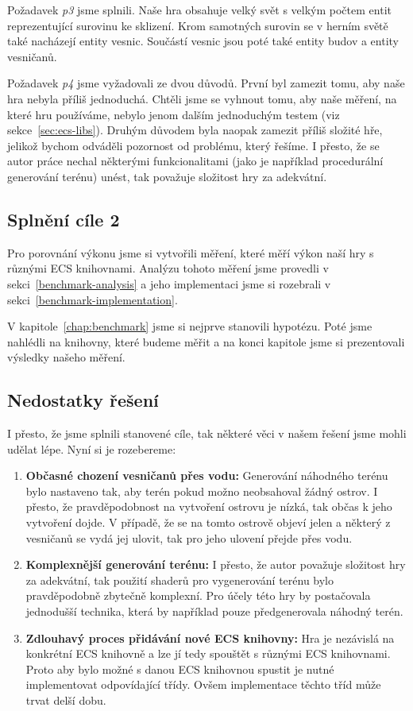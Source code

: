 Požadavek \textit{p3} jsme splnili. Naše hra obsahuje velký svět s velkým počtem entit reprezentující surovinu ke sklizení. Krom samotných surovin se v herním světě také nacházejí entity vesnic. Součástí vesnic jsou poté také entity budov a entity vesničanů.

Požadavek \textit{p4} jsme vyžadovali ze dvou důvodů. První byl zamezit tomu, aby naše hra nebyla příliš jednoduchá. Chtěli jsme se vyhnout tomu, aby naše měření, na které hru používáme, nebylo jenom dalším jednoduchým testem (viz sekce~\ref{sec:ecs-libs}). Druhým důvodem byla naopak zamezit příliš složité hře, jelikož bychom odváděli pozornost od problému, který řešíme. I přesto, že se autor práce nechal některými funkcionalitami (jako je například procedurální generování terénu) unést, tak považuje složitost hry za adekvátní.

\subsection{Splnění cíle 2}
Pro porovnání výkonu jsme si vytvořili měření, které měří výkon naší hry s různými ECS knihovnami. Analýzu tohoto měření jsme provedli v sekci~\ref{benchmark-analysis} a jeho implementaci jsme si rozebrali v sekci~\ref{benchmark-implementation}.

V kapitole~\ref{chap:benchmark} jsme si nejprve stanovili hypotézu. Poté jsme nahlédli na knihovny, které budeme měřit a na konci kapitole jsme si prezentovali výsledky našeho měření.

\subsection{Nedostatky řešení}
I přesto, že jsme splnili stanovené cíle, tak některé věci v našem řešení jsme mohli udělat lépe. Nyní si je rozebereme:

\begin{enumerate}
    \item \textbf{Občasné chození vesničanů přes vodu:} Generování náhodného terénu bylo nastaveno tak, aby terén pokud možno neobsahoval žádný ostrov. I přesto, že pravděpodobnost na vytvoření ostrovu je nízká, tak občas k jeho vytvoření dojde. V případě, že se na tomto ostrově objeví jelen a některý z vesničanů se vydá jej ulovit, tak pro jeho ulovení přejde přes vodu.

    \item \textbf{Komplexnější generování terénu:} I přesto, že autor považuje složitost hry za adekvátní, tak použití shaderů pro vygenerování terénu bylo pravděpodobně zbytečně komplexní. Pro účely této hry by postačovala jednodušší technika, která by například pouze předgenerovala náhodný terén.

    \item \textbf{Zdlouhavý proces přidávání nové ECS knihovny:} Hra je nezávislá na konkrétní ECS knihovně a lze jí tedy spouštět s různými ECS knihovnami. Proto aby bylo možné s danou ECS knihovnou spustit je nutné implementovat odpovídající třídy. Ovšem implementace těchto tříd může trvat delší dobu.
\end{enumerate}

